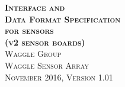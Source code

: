 \documentclass{article}
\begin{document}
\begin{titlepage}
  \begin{center}
        \Huge\textbf{\textsc{Interface and \\ Data Format Specification \\ for sensors \\
        \Large\textsc{(v2 sensor boards)}}}\\[0.5cm]
        \Large\textsc{Waggle Group \\ Waggle Sensor Array}\\[1cm]
        \large\textsc{November 2016, }
        \large\textsc{Version 1.01}\\
   \end{center}
\end{titlepage}

\tableofcontents
\newpage






\end{document}
